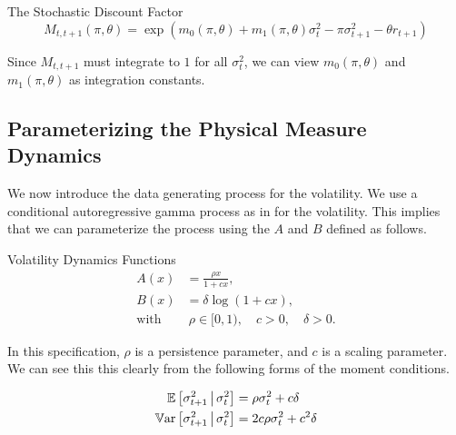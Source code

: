 \documentclass[11pt, letterpaper, twoside, final]{article}
\begin{document}
\begin{defn}{The Stochastic Discount Factor}
  \label{defn:SDF}
  \begin{equation}
    M_{t,t+1}(\pi, \theta) = \exp\left(m_{0}(\pi, \theta) + m_1(\pi, \theta) \sigma_t^2 - \pi \sigma^2_{t+1} -
    \theta r_{t+1}\right) 
  \end{equation}
\end{defn}

Since $M_{t,t+1}$ must integrate to $1$ for all $\sigma^2_t$, we can view $m_{0}(\pi, \theta)$ and $m_1(\pi, \theta)$ as integration constants.

\subsection{Parameterizing the Physical Measure Dynamics}

We now introduce the data generating process for the volatility. We use a conditional autoregressive gamma process as in \textcite{gourieroux2006autoregressive, khrapov2016affine} for the volatility. This implies that we can parameterize the process using the $A$ and $B$ defined as follows.

\begin{defn}{Volatility Dynamics Functions}
  \label{defn:physical_vol_dynamics}
  \begin{align}
    \label{defn:a_PP}
    A(x) &= \frac{\rho x}{1 + c x}, \\
    \label{defn:b_PP}
    B(x) &= \delta \log(1 + c x),\\
% 
    \text{with}&\ \rho \in [0,1), \quad c > 0, \quad \delta > 0. \nonumber
  \end{align}

\end{defn}

In this specification, $\rho$ is a persistence parameter, and $c$ is a scaling parameter.
We can see this this clearly from the following forms of the moment conditions.

\begin{remark} 
  \label{remark:vol_moment_conditions}
  \begin{align}
    \E\left[\sigma^2_{t+1} \mvert \sigma^2_t \right] &= \rho \sigma^2_t + c \delta\\
%
    \Var\left[\sigma^2_{t+1} \mvert \sigma^2_t \right] &= 2 c \rho \sigma^2_t + c^2
    \delta 
%
  \end{align}
\end{remark}
\end{document}
